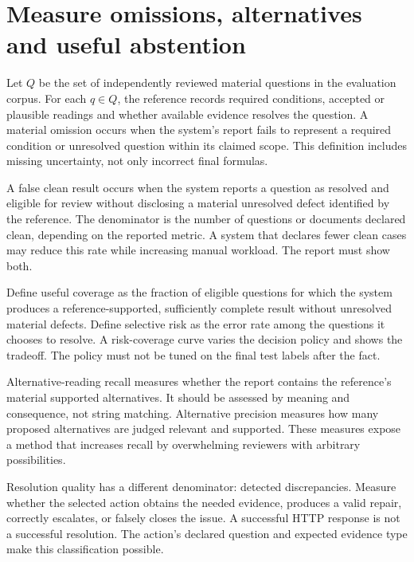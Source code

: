 \section{Measure omissions, alternatives and useful abstention}
\label{merge:M09:05}


Let $Q$ be the set of independently reviewed material questions in the evaluation
corpus. For each $q\in Q$, the reference records required conditions, accepted or
plausible readings and whether available evidence resolves the question. A
material omission occurs when the system's report fails to represent a required
condition or unresolved question within its claimed scope. This definition
includes missing uncertainty, not only incorrect final formulas.

A false clean result occurs when the system reports a question as resolved and
eligible for review without disclosing a material unresolved defect identified by
the reference. The denominator is the number of questions or documents declared
clean, depending on the reported metric. A system that declares fewer clean cases
may reduce this rate while increasing manual workload. The report must show both.

Define useful coverage as the fraction of eligible questions for which the system
produces a reference-supported, sufficiently complete result without unresolved
material defects. Define selective risk as the error rate among the questions it
chooses to resolve. A risk-coverage curve varies the decision policy and shows the
tradeoff. The policy must not be tuned on the final test labels after the fact.


Alternative-reading recall measures whether the report contains the reference's
material supported alternatives. It should be assessed by meaning and consequence,
not string matching. Alternative precision measures how many proposed alternatives
are judged relevant and supported. These measures expose a method that increases
recall by overwhelming reviewers with arbitrary possibilities.

Resolution quality has a different denominator: detected discrepancies. Measure
whether the selected action obtains the needed evidence, produces a valid repair,
correctly escalates, or falsely closes the issue. A successful HTTP response is
not a successful resolution. The action's declared question and expected evidence
type make this classification possible.

